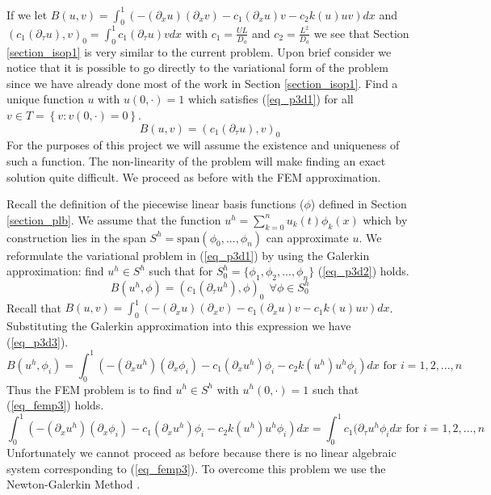 \documentclass[11pt,fleqn]{article}
\theoremstyle{defstyle}
\begin{document}
If we let $B(u, v) = \int_0^1 \left(-(\partial_xu)(\partial_xv) - c_1(\partial_xu)v - c_2k(u)uv\right)dx$ and $(c_1(\partial_{\tau}u),v)_0 = \int^1_0 c_1(\partial_{\tau}u)v dx$ with $c_1 = \frac{UL}{D_a}$ and $c_2 = \frac{L^2}{D_a}$ we see that Section \ref{section_isop1} is very similar to the current problem. Upon brief consider we notice that it is possible to go directly to the variational form of the problem since we have already done most of the work in Section \ref{section_isop1}.  Find a unique function $u$ with $u(0, \cdot)=1$ which satisfies (\ref{eq_p3d1}) for all $v \in T=\left\{v:v(0,\cdot)=0\right\}$.
\begin{equation}
B(u, v) = (c_1(\partial_{\tau}u),v)_0
\label{eq_p3d1}
\end{equation}
For the purposes of this project we will assume the existence and uniqueness of such a function. The non-linearity of the problem will make finding an exact solution quite difficult. We proceed as before with the FEM approximation.

Recall the definition of the piecewise linear basis functions ($\phi$) defined in Section \ref{section_plb}. We assume that the function $u^h =\sum^n_{k=0} u_k(t) \phi_k(x)$ which by construction lies in the span $S^h=\text{span}(\phi_0,...,\phi_n)$ can approximate $u$. We reformulate the variational problem in (\ref{eq_p3d1}) by using the Galerkin approximation: find $u^h \in S^h$ such that for $S^h_0=\{\phi_1, \phi_2,...,\phi_n \}$ (\ref{eq_p3d2}) holds.
\begin{equation}
B(u^h, \phi) = (c_1(\partial_{\tau}u^h),\phi)_0~~\forall \phi \in S^h_0
\label{eq_p3d2}
\end{equation} 
Recall that $B(u, v) = \int_0^1 \left(-(\partial_xu)(\partial_xv) - c_1(\partial_xu)v - c_1k(u)uv\right)dx$. Substituting the Galerkin approximation into this expression we have (\ref{eq_p3d3}).
\begin{equation}
B(u^h, \phi_i) = \int_0^1 \left(-(\partial_xu^h)(\partial_x\phi_i) - c_1(\partial_xu^h)\phi_i - c_2k(u^h)u^h\phi_i\right)dx \text{ for } i=1,2,...,n
\label{eq_p3d3}
\end{equation}
Thus the FEM problem is to find $u^h \in S^h$ with $u^h(0,\cdot)=1$ such that (\ref{eq_femp3}) holds.
\begin{equation}
\int_0^1 \left(-(\partial_xu^h)(\partial_x\phi_i) -c_1(\partial_xu^h)\phi_i - c_2k(u^h)u^h\phi_i\right)dx = \int_0^1 c_1(\partial_{\tau}u^h\phi_i dx \text{ for } i=1,2,...,n
\label{eq_femp3}
\end{equation}
Unfortunately we cannot proceed as before because there is no linear algebraic system corresponding to (\ref{eq_femp3}). To overcome this problem we use the Newton-Galerkin Method \cite{larson}.
\end{document}
